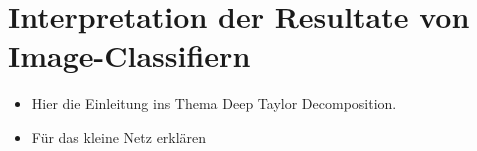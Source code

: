 \section{Interpretation der Resultate von Image-Classifiern}
\begin{itemize}
\item Hier die Einleitung ins Thema Deep Taylor Decomposition.
\item Für das kleine Netz erklären
\end{itemize}
